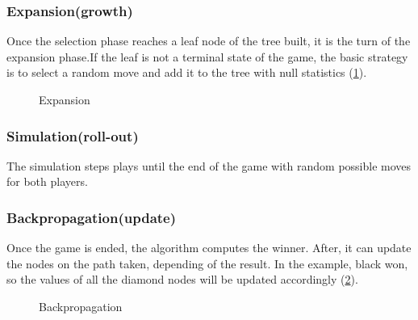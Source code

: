 \subsubsection{Expansion(growth)}
Once the selection phase reaches a leaf node of the tree built, it is the turn of the expansion phase.If the leaf is not a terminal state of the game, the basic strategy is to select a random move and add it to the tree with null statistics (\ref{Exp}).
\begin{figure}
\begin{center}
\end{center}
\caption{Expansion}
\label{Exp}
\end{figure}

\subsubsection{Simulation(roll-out)}
The simulation steps plays until the end of the game with random possible moves for both players. 

\subsubsection{Backpropagation(update)}
Once the game is ended, the algorithm computes the winner. After, it can update the nodes on the path taken, depending of the result. In the example, black won, so the values of all the diamond nodes will be updated accordingly (\ref{Back}). 
\begin{figure}
\begin{center}
\end{center}
\caption{Backpropagation}
\label{Back}
\end{figure}

